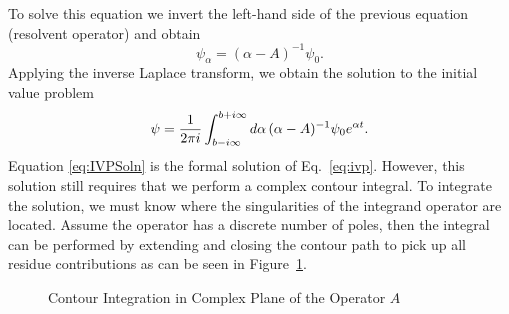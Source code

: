 To solve this equation we invert the left-hand side of the previous equation (resolvent operator) and obtain
\begin{equation}
	\psi_{\alpha} = (\alpha - A)^{-1}\psi_{0}.
\end{equation}
Applying the inverse Laplace transform, we obtain the solution to the initial value problem
\begin{equation}
	\psi = \frac{1}{2\pi i} \int_{b - i\infty}^{b + i\infty} \mathop{}\!d \alpha \, (\alpha - A)^{-1}\psi_{0} e^{\alpha t}.
	\label{eq:IVPSoln}
\end{equation}
Equation \ref{eq:IVPSoln} is the formal solution of Eq.~\ref{eq:ivp}. However, this solution still requires that we perform a complex contour integral. To integrate the solution, we must know where the singularities of the integrand operator are located. Assume the operator has a discrete number of poles, then the integral can be performed by extending and closing the contour path to pick up all residue contributions as can be seen in Figure~\ref{fig:Contour}.

\begin{figure}
\centering
\resizebox{0.5\textwidth}{!}{
}
\caption{Contour Integration in Complex Plane of the Operator $A$}
\label{fig:Contour}
\end{figure}


